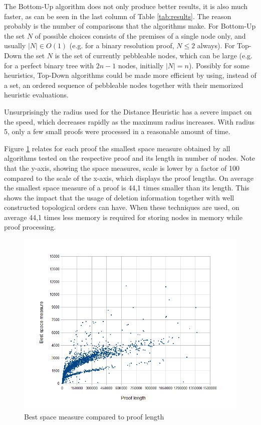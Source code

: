 The Bottom-Up algorithm does not only produce better results, it is also much faster, as can be seen in the last column of Table \ref{tab:results}. 
The reason probably is the number of comparisons that the algorithms make. 
For Bottom-Up the set $N$ of possible choices consists of the premises of a single node only, and usually $|N| \in O(1)$ (e.g. for a binary resolution proof, $N \leq 2$ always). 
For Top-Down the set $N$ is the set of currently pebbleable nodes, which can be large (e.g. for a perfect binary tree with $2n -1$ nodes, initially $|N| = n$). 
Possibly for some heuristics, Top-Down algorithms could be made more efficient by using, instead of a set, an ordered sequence of pebbleable nodes together with their memorized heuristic evaluations.

Unsurprisingly the radius used for the Distance Heuristic has a severe impact on the speed, which decreases rapidly as the maximum radius increases. 
With radius 5, only a few small proofs were processed in a reasonable amount of time.



Figure \ref{fig:SpaceVSLength} relates for each proof the smallest space measure obtained by all algorithms tested on the respective proof and its length in number of nodes. 
Note that the y-axis, showing the space measures, scale is lower by a factor of 100 compared to the scale of the x-axis, which displays the proof lengths. 
On average the smallest space measure of a proof is 44,1 times smaller than its length. 
This shows the impact that the usage of deletion information together with well constructed topological orders can have. 
When these techniques are used, on average 44,1 times less memory is required for storing nodes in memory while proof processing.


\begin{figure}
	\centering
	\includegraphics[scale=0.4]{Figures/length_vs_space_2.png}
	\caption{Best space measure compared to proof length}
	\label{fig:SpaceVSLength}
\end{figure}

